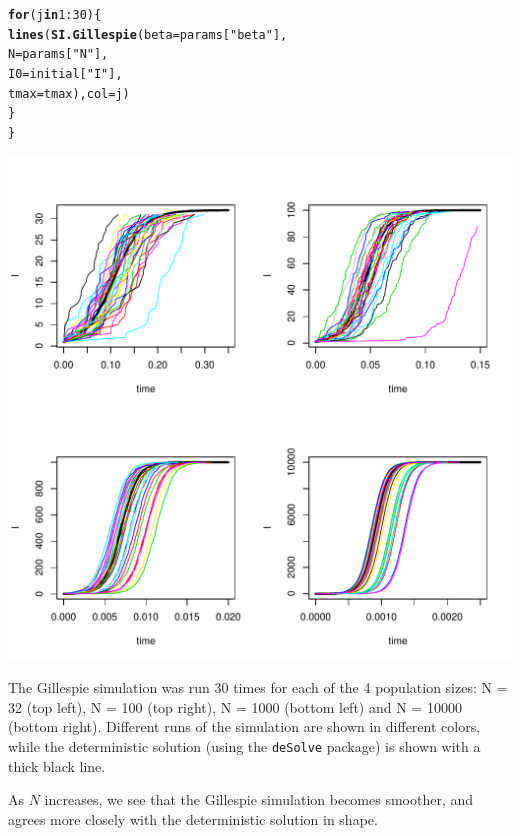 \documentclass[12pt]{article}\usepackage[]{graphicx}\usepackage[]{color}
\makeatletter
\def\maxwidth{ %
  \ifdim\Gin@nat@width>\linewidth
    \linewidth
  \else
    \Gin@nat@width
  \fi
}
\newcommand{\hlnum}[1]{\textcolor[rgb]{0.686,0.059,0.569}{#1}}%
\newcommand{\hlstr}[1]{\textcolor[rgb]{0.192,0.494,0.8}{#1}}%
\newcommand{\hlopt}[1]{\textcolor[rgb]{0,0,0}{#1}}%
\newcommand{\hlstd}[1]{\textcolor[rgb]{0.345,0.345,0.345}{#1}}%
\newcommand{\hlkwa}[1]{\textcolor[rgb]{0.161,0.373,0.58}{\textbf{#1}}}%
\newcommand{\hlkwc}[1]{\textcolor[rgb]{0.333,0.667,0.333}{#1}}%
\newcommand{\hlkwd}[1]{\textcolor[rgb]{0.737,0.353,0.396}{\textbf{#1}}}%
\newenvironment{kframe}{%
 \def\at@end@of@kframe{}%
 \ifinner\ifhmode%
  \def\at@end@of@kframe{\end{minipage}}%
  \begin{minipage}{\columnwidth}%
 \fi\fi%
 \def\FrameCommand##1{\hskip\@totalleftmargin \hskip-\fboxsep
 \colorbox{shadecolor}{##1}\hskip-\fboxsep
     \hskip-\linewidth \hskip-\@totalleftmargin \hskip\columnwidth}%
 \MakeFramed {\advance\hsize-\width
   \@totalleftmargin\z@ \linewidth\hsize
   \@setminipage}}%
 {\par\unskip\endMakeFramed%
 \at@end@of@kframe}
\newenvironment{knitrout}{}{} %
\makeatother
\begin{document}
\begin{enumerate}[(a)]
\begin{knitrout}
\begin{kframe}
\begin{alltt}
  \hlkwa{for} \hlstd{(j} \hlkwa{in} \hlnum{1}\hlopt{:}\hlnum{30}\hlstd{)\{}
    \hlkwd{lines}\hlstd{(}\hlkwd{SI.Gillespie}\hlstd{(}\hlkwc{beta} \hlstd{= params[}\hlstr{"beta"}\hlstd{],}
                       \hlkwc{N} \hlstd{= params[}\hlstr{"N"}\hlstd{],}
                       \hlkwc{I0} \hlstd{= initial[}\hlstr{"I"}\hlstd{],}
                       \hlkwc{tmax} \hlstd{= tmax),} \hlkwc{col} \hlstd{= j)}
  \hlstd{\}}
\hlstd{\}}
\end{alltt}
\end{kframe}
\includegraphics[width=\maxwidth]{figure/unnamed-chunk-8-1} 

\end{knitrout}

The Gillespie simulation was run 30 times for each of the 4 population sizes: N = 32 (top left), N = 100 (top right), N = 1000 (bottom left) and N = 10000 (bottom right). Different runs of the simulation are shown in different colors, while the deterministic solution (using the \texttt{deSolve} package) is shown with a thick black line. 

As $N$ increases, we see that the Gillespie simulation becomes smoother, and agrees more closely with the deterministic solution in shape. 

\end{enumerate}
\end{document}
